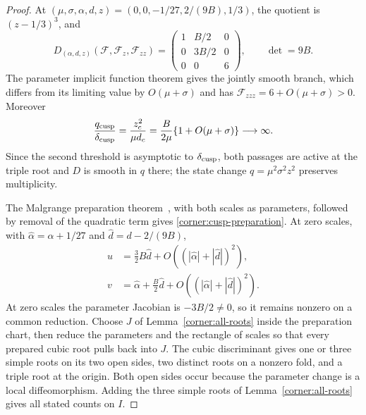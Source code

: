 \begin{proof}
At $(\mu,\sigma,\alpha,d,z)=(0,0,-1/27,2/(9B),1/3)$,
the quotient is $(z-1/3)^3$, and
\[
 D_{(\alpha,d,z)}(\mathcal F,\mathcal F_z,\mathcal F_{zz})
 =\begin{pmatrix}1&B/2&0\\0&3B/2&0\\0&0&6\end{pmatrix},
 \qquad \det=9B.
\]
The parameter implicit function theorem gives the jointly smooth branch,
which differs from its limiting value by $O(\mu+\sigma)$ and has
$\mathcal F_{zzz}=6+O(\mu+\sigma)>0$.
Moreover
\[
 \frac{q_{\rm cusp}}{\delta_{\rm cusp}}
 =\frac{z_c^2}{\mu d_c}
 =\frac B{2\mu}\{1+O(\mu+\sigma)\}\longrightarrow\infty.
\]
Since the second threshold is asymptotic to $\delta_{\rm cusp}$, both
passages are active at the triple root and $D$ is smooth in $q$ there; the
state change $q=\mu^2\sigma^2z^2$ preserves multiplicity.

The Malgrange preparation theorem~\cite[Chapter~IV, Section~2, Theorem~2.1 and Note~(1), p.~95]{golubitsky1973}, with
both scales as parameters, followed by removal of the quadratic term gives
\eqref{corner:cusp-preparation}. At zero scales, with
$\widehat\alpha=\alpha+1/27$ and $\widehat d=d-2/(9B)$,
\[
\begin{aligned}
 u&=\tfrac32B\widehat d+O((|\widehat\alpha|+|\widehat d|)^2),\\
 v&=\widehat\alpha+\tfrac B2\widehat d
                         +O((|\widehat\alpha|+|\widehat d|)^2).
\end{aligned}
\]
At zero scales the parameter Jacobian is $-3B/2\ne0$, so it remains
nonzero on a common reduction.
Choose $J$ of Lemma~\ref{corner:all-roots} inside the preparation chart,
then reduce the parameters and the rectangle of scales so that every prepared
cubic root pulls back into $J$. The cubic discriminant gives one or
three simple roots on its two open sides, two distinct roots on a
nonzero fold, and a triple root at the origin. Both open sides occur
because the parameter change is a local diffeomorphism. Adding the three
simple roots of Lemma~\ref{corner:all-roots} gives all stated counts
on $I$.


\end{proof}
